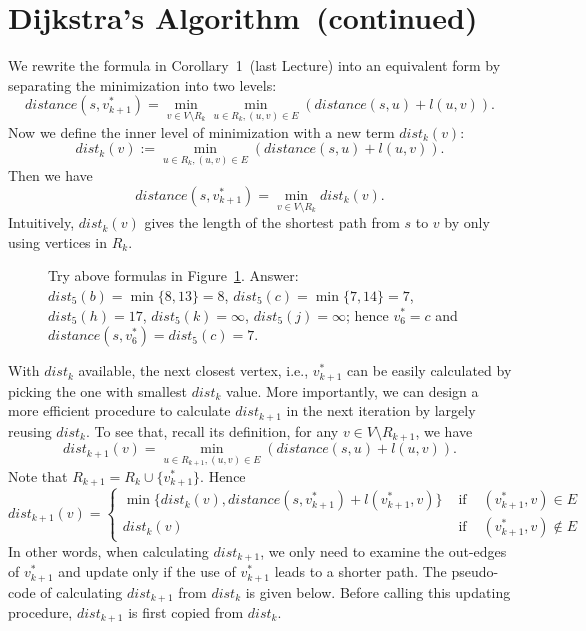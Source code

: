 \section*{Dijkstra's Algorithm~(continued)}


We rewrite the formula in Corollary~1~(last Lecture) into an equivalent form by separating the minimization into two levels:
$$distance(s, v_{k+1}^*) = \textstyle \min_{v\in V\setminus R_k} \min_{u\in R_k, (u, v)\in E} (distance(s, u) + l(u,v)).$$
Now we define the inner level of minimization with a new term $dist_k(v)$:
$$dist_k(v) := \textstyle \min_{u\in R_k, (u, v)\in E} (distance(s, u) + l(u,v)).$$
Then we have 
$$distance(s, v_{k+1}^*) = \textstyle \min_{v\in V\setminus R_k} dist_k(v).$$
Intuitively, $dist_k(v)$ gives the length of the shortest path from $s$ to $v$ by only using vertices in $R_k$.

\begin{figure}[h]
\centering{}
\caption{Try above formulas in Figure~\ref{fig:extension}.
Answer: $dist_5(b) = \min\{8, 13\} = 8$, $dist_5(c) = \min\{7, 14\} = 7$, $dist_5(h) = 17$, $dist_5(k) = \infty$, $dist_5(j) = \infty$;
hence $v_6^* = c$ and $distance(s,v_6^*) = dist_5(c) = 7$.}
\label{fig:extension}
\end{figure}

With $dist_k$ available, the next closest vertex, i.e., $v_{k+1}^*$ can be easily calculated
by picking the one with smallest $dist_k$ value.
More importantly, we can design a more efficient procedure
to calculate $dist_{k+1}$ in the next iteration by largely reusing $dist_k$.
To see that, recall its definition, for any $v\in V\setminus R_{k+1}$, we have 
$$dist_{k+1}(v) = \textstyle \min_{u\in R_{k+1}, (u, v)\in E} (distance(s, u) + l(u,v)).$$
Note that $R_{k+1} = R_k \cup \{v_{k+1}^*\}$. Hence
\begin{displaymath}
dist_{k+1}(v) = \left\{
\begin{array}{llllll}
\min\{ dist_k(v), distance(s, v_{k+1}^*) + l(v_{k+1}^*, v) \} & \textrm{ if } & (v_{k+1}^*, v) \in E \\
dist_k(v) & \textrm{ if } & (v_{k+1}^*, v) \not\in E
\end{array}
\right.
\end{displaymath}
In other words, when calculating $dist_{k+1}$, we only need to examine the out-edges of $v_{k+1}^*$
and update only if the use of $v_{k+1}^*$ leads to a shorter path. The pseudo-code of
calculating $dist_{k+1}$ from $dist_k$ is given below.
Before calling this updating procedure, $dist_{k+1}$ is first copied from $dist_k$.

